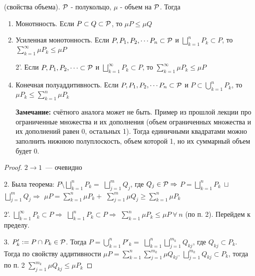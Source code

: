 \renewcommand{\P}{\PP}
\begin{theorem}
    (свойства объема). $\mathcal{P}$ - полукольцо, $\mu$ - объем на $\mathcal{P}$. Тогда
    \begin{enumerate}
        \item Монотнность. Если $P \subset Q \subset \mathcal{P}$, то $\mu P \leq \mu Q$
        \item Усиленная монотонность. Если $P, P_1, P_2, \cdots P_n \subset \mathcal{P}$ и
        $\bigsqcup \limits_{k = 1}^n P_k \subset P$, то $\sum \limits_{k = 1}^\infty \mu P_k \leq \mu P$
        \item[2'.] Если $P, P_1, P_2, \cdots \subset \mathcal{P}$ и
        $\bigsqcup \limits_{k = 1}^\infty P_k \subset P$, то $\sum \limits_{k = 1}^\infty \mu P_k \leq \mu P$
        \item Конечная полуаддитивность. Если $P, P_1, P_2, \cdots P_n \subset \mathcal{P}$ и
        $P \subset \bigcup \limits_{k = 1}^n P_k$, то $\mu P_k \leq \sum \limits_{k = 1}^n \mu P_k$

        \textbf{Замечание:} счётного аналога может не быть. Пример из прошлой лекции про
        ограниченные множества и их дополнения 
        (объем ограниченных множества и их дополнений равен 0, остальных 1).
        Тогда единичными квадратами можно заполнить нижнюю полуплоскость, объем которой 1, но их суммарный объем будет 0.
    \end{enumerate}
\end{theorem}

\begin{proof}
    $2 \to 1$~--- очевидно
   
   2. Была теорема: $P \setminus \bigsqcup \limits_{k = 1}^{n} P_k =  $
   $\bigsqcup \limits_{j = 1}^{m} Q_j$, где $Q_j \in \mathcal{P} \Rightarrow $
   $P = \bigsqcup \limits_{k = 1}^{n} P_k \ \sqcup $
    $\bigsqcup \limits_{j = 1}^{m} Q_j \Rightarrow$
    $\mu P = \sum \limits_{k=1}^{n} \mu P_k + $
    $\sum \limits_{j=1}^{m} \mu Q_j \ge  \sum \limits_{k=1}^{n} \mu P_k$
   
   
   2'. $\bigsqcup \limits_{k = 1}^{\infty} P_k \subset P \Rightarrow$
   $\bigsqcup \limits_{k = 1}^{n} P_k \subset P \Rightarrow$
   $\sum \limits_{k=1}^{n} \mu P_k \le \mu P \ \forall \ n$ (по п. 2).
   Перейдем к пределу.
   
   3. $P'_k := P \cap P_k \in \P$. 
   Тогда $P = \bigcup \limits_{k = 1}^n P'_k =$
   $\bigsqcup \limits_{k = 1}^{n} \bigsqcup \limits_{j = 1}^{m_k} Q_{kj}$, где
   $Q_{kj} \subset P_k$. Тогда по свойству аддитивности
   $\mu P = \sum \limits_{k=1}^{n} \sum \limits_{j=1}^{m_k} \mu Q_{kj}$.
   $\bigsqcup \limits_{j = 1}^{m_k} Q_{kj} \subset P_k$, тогда по п. 2 
   $\sum \limits_{j=1}^{m_k} \mu Q_{kj} \le \mu P_k$
\end{proof}
   
